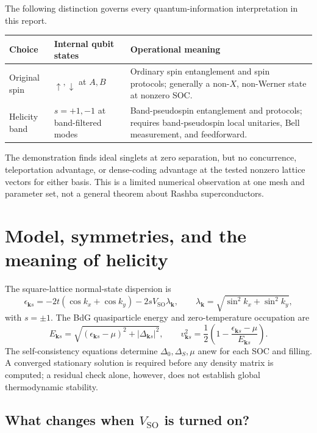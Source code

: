 \documentclass[11pt]{article}
\newcommand{\SO}{V_{\mathrm{SO}}}
\newcommand{\kb}{\mathbf k}
\begin{document}
The following distinction governs every quantum-information interpretation in this report.
\begin{center}
\small
\begin{tabular}{p{}p{}p{}}
\toprule
Choice & Internal qubit states & Operational meaning \\
\midrule
Original spin & $\uparrow,\downarrow$ at $A,B$ & Ordinary spin entanglement and spin protocols; generally a non-$X$, non-Werner state at nonzero SOC. \\
Helicity band & $s=+1,-1$ at band-filtered modes & Band-pseudospin entanglement and protocols; requires band-pseudospin local unitaries, Bell measurement, and feedforward. \\
\bottomrule
\end{tabular}
\end{center}

The demonstration finds ideal singlets at zero separation, but no concurrence, teleportation advantage, or dense-coding advantage at the tested nonzero lattice vectors for either basis. This is a limited numerical observation at one mesh and parameter set, not a general theorem about Rashba superconductors.

\section{Model, symmetries, and the meaning of helicity}
\label{sec:model}

The square-lattice normal-state dispersion is
\begin{equation}
\epsilon_{\kb s}
=-2t(\cos k_x+\cos k_y)-2s\SO\lambda_{\kb},
\qquad
\lambda_{\kb}=\sqrt{\sin^2k_x+\sin^2k_y},
\label{eq:dispersion}
\end{equation}
with $s=\pm1$. The BdG quasiparticle energy and zero-temperature occupation are
\begin{equation}
E_{\kb s}=\sqrt{(\epsilon_{\kb s}-\mu)^2+|\Delta_{\kb s}|^2},
\qquad
v_{\kb s}^2=\frac12\left(1-\frac{\epsilon_{\kb s}-\mu}{E_{\kb s}}\right).
\label{eq:energy}
\end{equation}
The self-consistency equations determine $\Delta_0,\Delta_S,\mu$ anew for each SOC and filling. A converged stationary solution is required before any density matrix is computed; a residual check alone, however, does not establish global thermodynamic stability.

\subsection{What changes when $\SO$ is turned on?}
\end{document}
